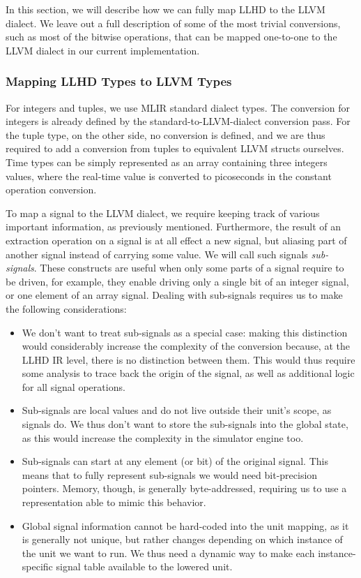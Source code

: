 In this section, we will describe how we can fully map LLHD to the LLVM dialect. We leave out a full description of some of the most trivial conversions, such as most of the bitwise operations, that can be mapped one-to-one to the LLVM dialect in our current implementation.


\subsubsection{Mapping LLHD Types to LLVM Types}
\label{sec:typeconv}
For integers and tuples, we use MLIR standard dialect types. The conversion for integers is already defined by the standard-to-LLVM-dialect conversion pass. For the tuple type, on the other side, no conversion is defined, and we are thus required to add a conversion from tuples to equivalent LLVM structs ourselves. Time types can be simply represented as an array containing three integers values, where the real-time value is converted to picoseconds in the constant operation conversion.

To map a signal to the LLVM dialect, we require keeping track of various important information, as previously mentioned. Furthermore, the result of an extraction operation on a signal is at all effect a new signal, but aliasing part of another signal instead of carrying some value. We will call such signals \textit{sub-signals}. These constructs are useful when only some parts of a signal require to be driven, for example, they enable driving only a single bit of an integer signal, or one element of an array signal.
Dealing with sub-signals requires us to make the following considerations:

\begin{itemize}
    \item We don't want to treat sub-signals as a special case: making this distinction would considerably increase the complexity of the conversion because, at the LLHD IR level, there is no distinction between them. This would thus require some analysis to trace back the origin of the signal, as well as additional logic for all signal operations.
    \item Sub-signals are local values and do not live outside their unit's scope, as signals do. We thus don't want to store the sub-signals into the global state, as this would increase the complexity in the simulator engine too.
    \item Sub-signals can start at any element (or bit) of the original signal. This means that to fully represent sub-signals we would need bit-precision pointers. Memory, though, is generally byte-addressed, requiring us to use a representation able to mimic this behavior.
    \item Global signal information cannot be hard-coded into the unit mapping, as it is generally not unique, but rather changes depending on which instance of the unit we want to run. We thus need a dynamic way to make each instance-speciﬁc signal table available to the lowered unit.
\end{itemize}

